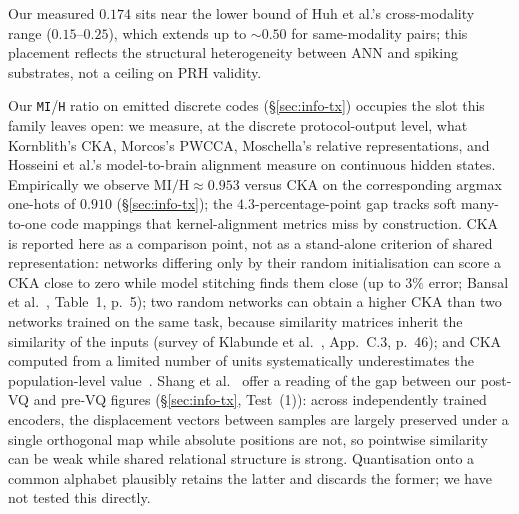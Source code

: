 \documentclass[10pt,twocolumn]{article}
\begin{document}
Our measured $0.174$ sits near the lower bound of Huh et al.'s cross-modality range ($0.15$--$0.25$), which extends up to $\sim 0.50$ for same-modality pairs; this placement reflects the structural heterogeneity between ANN and spiking substrates, not a ceiling on PRH validity.

Our \texttt{MI}/\texttt{H} ratio on emitted discrete codes (\S\ref{sec:info-tx}) occupies the slot this family leaves open: we measure, at the discrete protocol-output level, what Kornblith's CKA, Morcos's PWCCA, Moschella's relative representations, and Hosseini et al.'s model-to-brain alignment measure on continuous hidden states. Empirically we observe $\mathrm{MI}/\mathrm{H} \approx 0.953$ versus $\mathrm{CKA}$ on the corresponding argmax one-hots of $0.910$ (\S\ref{sec:info-tx}); the $4.3$-percentage-point gap tracks soft many-to-one code mappings that kernel-alignment metrics miss by construction. CKA is reported here as a comparison point, not as a stand-alone criterion of shared representation: networks differing only by their random initialisation can score a CKA close to zero while model stitching finds them close (up to $3\%$ error; Bansal et al.~\cite{bansal2021stitching}, Table~1, p.~5); two random networks can obtain a higher CKA than two networks trained on the same task, because similarity matrices inherit the similarity of the inputs (survey of Klabunde et al.~\cite{klabunde2025similarity}, App.~C.3, p.~46); and CKA computed from a limited number of units systematically underestimates the population-level value~\cite{kang2025spectral}. Shang et al.~\cite{shang2026displacement} offer a reading of the gap between our post-VQ and pre-VQ figures (\S\ref{sec:info-tx}, Test~(1)): across independently trained encoders, the displacement vectors between samples are largely preserved under a single orthogonal map while absolute positions are not, so pointwise similarity can be weak while shared relational structure is strong. Quantisation onto a common alphabet plausibly retains the latter and discards the former; we have not tested this directly.
\end{document}
